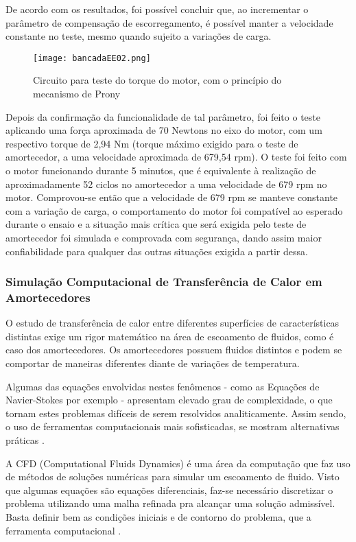 			De acordo com os resultados, foi possível concluir que, ao incrementar o parâmetro de compensação de escorregamento, é possível manter a velocidade constante no teste, mesmo quando sujeito a variações de carga.

			\newpage
			\begin{figure}[!h]
				\centering
				\texttt{[image: bancadaEE02.png]}
				\caption[Circuito para teste do torque do motor, com o princípio do mecanismo de Prony]{Circuito para teste do torque do motor, com o princípio do mecanismo de Prony} 
				\label{bancadaEE02}
			\end{figure}

			Depois da confirmação da funcionalidade de tal parâmetro, foi feito o teste aplicando uma força aproximada de 70 Newtons no eixo do motor, com um respectivo torque de 2,94 Nm (torque máximo exigido para o teste de amortecedor, a uma velocidade aproximada de 679,54 rpm). O teste foi feito com o motor funcionando durante 5 minutos, que é equivalente à realização de aproximadamente 52 ciclos no amortecedor a uma velocidade de 679 rpm no motor. Comprovou-se então que a velocidade de 679 rpm se manteve constante com a variação de carga, o comportamento do motor foi compatível ao esperado durante o ensaio e a situação mais crítica que será exigida pelo teste de amortecedor foi simulada e comprovada com segurança, dando assim maior confiabilidade para qualquer das outras situações exigida a partir dessa.

\newpage
\subsubsection{Simulação Computacional de Transferência de Calor em Amortecedores}

	O estudo de transferência de calor entre diferentes superfícies de características distintas exige um rigor matemático na área de escoamento de fluidos, como é caso dos amortecedores. Os amortecedores possuem fluidos distintos e podem se comportar de maneiras diferentes diante de variações de temperatura.
	
	Algumas das equações envolvidas nestes fenômenos - como as Equações de Navier-Stokes por exemplo - apresentam elevado grau de complexidade, o que tornam estes problemas difíceis de serem resolvidos analiticamente. Assim sendo, o uso de ferramentas computacionais mais sofisticadas, se mostram alternativas práticas \cite{Neto}. 
	
	A CFD (Computational Fluids Dynamics) é uma área da computação que faz uso de métodos de soluções numéricas para simular um escoamento de fluido. Visto que algumas equações são equações diferenciais, faz-se necessário discretizar o problema  utilizando uma malha refinada pra alcançar uma solução admissível. Basta definir bem as condições iniciais e de contorno do problema, que a ferramenta computacional \cite{Neto}. 
	
